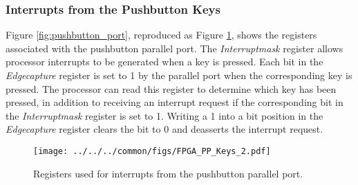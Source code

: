 \subsubsection{Interrupts from the Pushbutton Keys}

Figure \ref{fig:pushbutton_port}, reproduced as Figure \ref{fig:pushbutton_port_int},
shows the registers associated with the pushbutton parallel port. 
The {\it Interruptmask} register allows processor interrupts to be generated when a key is
pressed.  Each bit in the {\it Edgecapture} register is set to 1 by the parallel port when the
corresponding key is pressed. The processor can read this register
to determine which key has been pressed, in addition to receiving an interrupt request if the
corresponding bit in the {\it Interruptmask} register is set to 1. Writing a 1 into a bit position
in the {\it Edgecapture} register clears the bit to 0 and deasserts the interrupt request.

\begin{figure}[h!]
   \begin{center}
       \texttt{[image: ../../../common/figs/FPGA\_PP\_Keys\_2.pdf]}
   \end{center}
   \caption{Registers used for interrupts from the pushbutton parallel port.}
	\label{fig:pushbutton_port_int}
\end{figure}